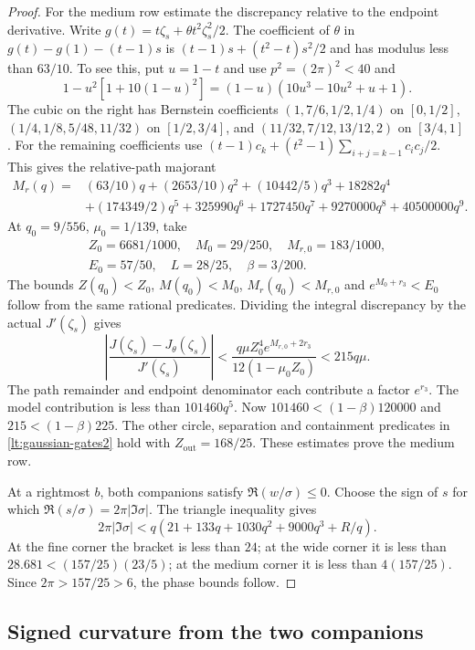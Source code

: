 \begin{proof}
For the medium row estimate the discrepancy relative to
the endpoint derivative. Write
$g(t)=t\zeta_s+\theta t^2\zeta_s^2/2$. The coefficient of $\theta$
in $g(t)-g(1)-(t-1)s$ is
$(t-1)s+(t^2-t)s^2/2$ and has modulus less than $63/10$.
To see this, put $u=1-t$ and use $p^2=(2\pi)^2<40$ and
\[
 1-u^2[1+10(1-u)^2]=(1-u)(10u^3-10u^2+u+1).
\]
The cubic on the right has Bernstein coefficients
$(1,7/6,1/2,1/4)$ on $[0,1/2]$,
$(1/4,1/8,5/48,11/32)$ on $[1/2,3/4]$, and
$(11/32,7/12,13/12,2)$ on $[3/4,1]$.
For the remaining coefficients use
$(t-1)c_k+(t^2-1)\sum_{i+j=k-1}c_ic_j/2$.
This gives the relative-path majorant
\begin{align*}
 M_r(q)={}&(63/10)q+(2653/10)q^2+(10442/5)q^3+18282q^4\\
 &+(174349/2)q^5+325990q^6+1727450q^7
       +9270000q^8+40500000q^9.
\end{align*}
At $q_0=9/556$, $\mu_0=1/139$, take
\begin{gather*}
 Z_0=6681/1000,\quad M_0=29/250,\quad M_{r,0}=183/1000,\\
 E_0=57/50,\quad L=28/25,\quad\beta=3/200.
\end{gather*}
The bounds $Z(q_0)<Z_0$, $M(q_0)<M_0$, $M_r(q_0)<M_{r,0}$ and
$e^{M_0+r_3}<E_0$ follow from the same rational predicates.
Dividing the integral discrepancy by the actual $J'(\zeta_s)$ gives
\begin{equation}\label{lt:relative-gaussian-error}
 \left|\frac{J(\zeta_s)-J_\theta(\zeta_s)}{J'(\zeta_s)}\right|
 <\frac{q\mu Z_0^4e^{M_{r,0}+2r_3}}{12(1-\mu_0Z_0)}
 <215q\mu.
\end{equation}
The path remainder and endpoint denominator each contribute a factor
$e^{r_3}$. The model contribution is less than
$101460q^5$. Now $101460<(1-\beta)120000$ and
$215<(1-\beta)225$. The other circle, separation and containment
predicates in \eqref{lt:gaussian-gates2} hold with
$Z_{\mathrm{out}}=168/25$.
These estimates prove the medium row.

At a rightmost $b$, both companions satisfy $\Re(w/\sigma)\le0$.
Choose the sign of $s$ for which
$\Re(s/\sigma)=2\pi|\Im\sigma|$. The triangle inequality gives
\[
 2\pi|\Im\sigma|<q\left(21+133q+1030q^2+9000q^3+R/q\right).
\]
At the fine corner the bracket is less than $24$; at the wide corner
it is less than $28.681<(157/25)(23/5)$; at the medium corner it is
less than $4(157/25)$. Since $2\pi>157/25>6$, the phase bounds follow.
\end{proof}

\subsection{Signed curvature from the two companions}

